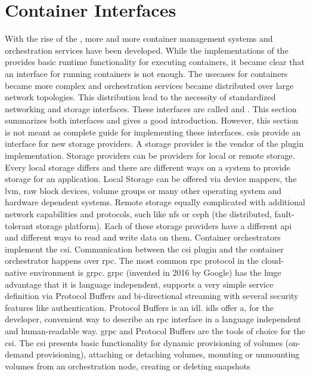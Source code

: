 \documentclass[titlepage]{report}
\begin{document}
\section{Container Interfaces}
With the rise of the , more and more container management systems and orchestration services have been developed.
While the implementations of the  provides basic runtime functionality for executing containers, it became clear that
an interface for running containers is not enough. The usecases for containers became more complex and orchestration services became
distributed over large network topologies. This distribution lead to the necessity of standardized networking and storage interfaces.
These interfaces are called  and . This section summarizes both interfaces and gives a good introduction.
However, this section is not meant as complete guide for implementing these interfaces. \glspl{csi} provide an interface for new storage providers.
A storage provider is the vendor of the plugin implementation\cite{CSISpec}. Storage providers can be providers for local or remote storage.
Every local storage differs and there are different ways on a system to provide storage for an application. Local Storage can be offered
via device mappers, the \gls{lvm}, raw block devices, volume groups or many other operating system and hardware dependent systems. Remote
storage equally complicated with additional network capabilities and protocols, such like \gls{nfs} or ceph (the distributed, fault-tolerant storage platform).
Each of these storage providers have a different \gls{api} and different ways to read and write data on them.
Container orchestrators implement the \gls{csi}. Communication between the \gls{csi} plugin and the container orchestrator happens over \gls{rpc}. The most common \gls{rpc} protocol
in the cloud-native environment is \gls{grpc}. \gls{grpc} (invented in 2016 by Google) has the huge advantage that it is language independent, supports a very
simple service definition via Protocol Buffers and bi-directional streaming with several security features like authentication\cite{GRPCConcepts}.
Protocol Buffers is an \gls{idl}. \glspl{idl} offer a, for the developer, convenient way to describe an \gls{rpc} interface in a language independent and
human-readable way. \gls{grpc} and Protocol Buffers are the tools of choice for the \gls{csi}. The \gls{csi} presents basic functionality for 
dynamic provisioning of volumes (on-demand provisioning), attaching or detaching volumes, mounting or unmounting volumes from an orchestration node, creating or deleting snapshots
\end{document}
